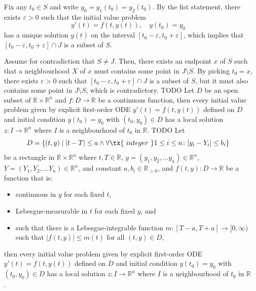 \documentclass[a4paper,12pt]{report}
\begin{document}
Fix any $t_0\in S$ and write $y_0=y_1(t_0)=y_2(t_0)$. By the fist statement, there exists $\varepsilon>0$ such that the initial value problem
\[y'(t)=f(t,y(t)),\quad y(t_0)=y_0\]
has a unique solution $y(t)$ on the interval $[t_0-\varepsilon,t_0+\varepsilon]$, which implies that $[t_0-\varepsilon,t_0+\varepsilon]\cap J$ is a subset of $S$.

Assume for contradiction that $S\ne J$. Then, there exists an endpoint $x$ of $S$ such that a neighbourhood $X$ of $x$ must contains some point in $J\setminus S$. By picking $t_0=x$, there exists $\varepsilon>0$ such that $[t_0-\varepsilon,t_0+\varepsilon]\cap J$ is a subset of $S$, but it must also contains some point in $J\setminus S$, which is contradictory.
\epr
{}
TODO
Let $D$ be an open subset of $\mathbb{R}\times\mathbb{R}^n$ and $f\colon D\to \mathbb {R}$ be a continuous function, then every initial value problem given by explicit first-order ODE $y'(t)=f\left(t,y(t)\right)$ defined on $D$ and initial condition $y\left(t_{0}\right)=y_{0}$ with $(t_{0},y_{0})\in D$ has a local solution $z\colon I\to \mathbb {R}^n$ where $I$ is a neighbourhood of $t_0$ in $\mathbb {R} $.
TODO
Let
\[D=\{(t,y)\mid|t-T|\leq a\land\forall\tx{\ integer\ }1\leq i\leq n\colon |y_i-Y_i|\leq b_i\}\]
be a rectangle in $\mathbb{R}\times\mathbb{R}^n$ where $t,T\in\mathbb{R}$, $y=(y_1, y_2,\dots  y_n)\in\mathbb{R}^n$, $Y=(Y_1, Y_2,\dots  Y_n)\in\mathbb{R}^n$, and constant $a,b_i\in\mathbb{R}_{>0}$, and $f(t,y)\colon D\to \mathbb {R}$ be a function that is:
\begin{itemize}
\item continuous in $y$ for each fixed $t$,
\item Lebesgue-measurable in $t$ for each fixed $y$, and
\item such that there is a Lebesgue-integrable function $m\colon [T-a,T+a]\to [0,\infty )$ such that $|f(t,y)|\leq m(t)$ for all $(t,y)\in D$,
\end{itemize}
then every initial value problem given by explicit first-order ODE $y'(t)=f\left(t,y(t)\right)$ defined on $D$ and initial condition $y\left(t_{0}\right)=y_{0}$ with $(t_{0},y_{0})\in D$ has a local solution $z\colon I\to \mathbb {R}^n$ where $I$ is a neighbourhood of $t_0$ in $\mathbb{R}$.
\end{document}
